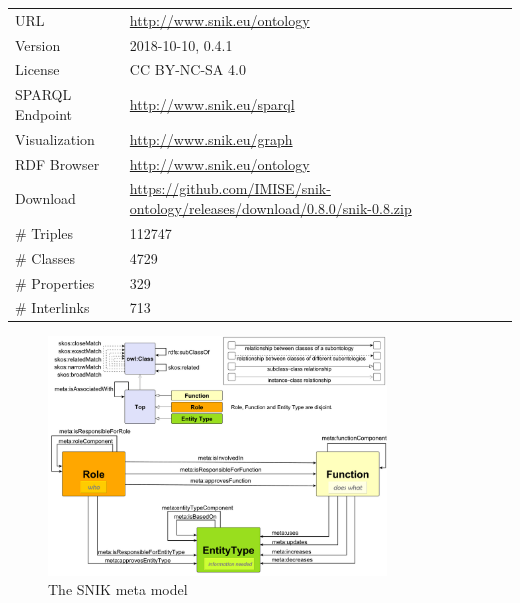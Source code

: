 \documentclass[sw]{iosart2x}
\begin{document}
\begin{tabulary}{\columnwidth}{lL}
\toprule
URL		&\url{http://www.snik.eu/ontology}\\
Version		&2018-10-10, 0.4.1\\
License		&CC BY-NC-SA 4.0\\
SPARQL Endpoint	&\url{http://www.snik.eu/sparql}\\
Visualization	&\url{http://www.snik.eu/graph}\\
RDF Browser	&\url{http://www.snik.eu/ontology}\\
Download	&\url{https://github.com/IMISE/snik-ontology/releases/download/0.8.0/snik-0.8.zip}\\
\# Triples	&\num{112747}\\
\# Classes	&\num{4729}\\
\# Properties	&\num{329}\\
\# Interlinks	&\num{713}\\
\bottomrule
\end{tabulary}%

\begin{figure}
\caption{The SNIK meta model}
\label{fig:metamodel}
\includegraphics[width=0.8\textwidth]{img/metamodel9s.pdf}
\end{figure}
\end{document}
